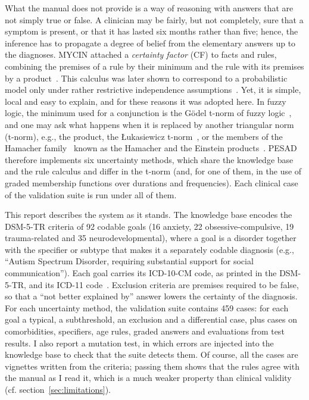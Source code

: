 What the manual does not provide is a way of reasoning with answers that are
not simply true or false. A clinician may be fairly, but not completely, sure
that a symptom is present, or that it has lasted six months rather than five;
hence, the inference has to propagate a degree of belief from the elementary
answers up to the diagnoses. MYCIN attached a \emph{certainty factor} (CF) to
facts and rules, combining the premises of a rule by their minimum and the rule
with its premises by a product~\cite{shortliffe-buchanan}. This calculus was
later shown to correspond to a probabilistic model only under rather restrictive
independence assumptions~\cite{heckerman}. Yet, it is simple, local and easy to
explain, and for these reasons it was adopted here. In fuzzy logic, the minimum used for a
conjunction is the G\"odel t-norm of fuzzy logic~\cite{zadeh,hajek}, and one may
ask what happens when it is replaced by another triangular norm (t-norm), e.g.,
the product, the \L{}ukasiewicz t-norm~\cite{lukasiewicz}, or the members of the
Hamacher family~\cite{hamacher} known as the Hamacher and the Einstein
products~\cite{klement}. PESAD therefore implements six uncertainty methods,
which share the knowledge base and the rule calculus and differ in the t-norm
(and, for one of them, in the use of graded membership functions over
durations and frequencies). Each clinical case of the validation suite is run under
all of them.

This report describes the system as it stands. The knowledge base encodes the
DSM-5-TR criteria of 92 codable goals (16 anxiety, 22 obsessive-compulsive, 19
trauma-related and 35 neurodevelopmental), where a goal is a disorder together
with the specifier or subtype that makes it a separately codable diagnosis
(e.g., ``Autism Spectrum Disorder, requiring substantial support for social
communication''). Each goal carries its ICD-10-CM code, as printed in the
DSM-5-TR, and its ICD-11 code~\cite{icd11}. Exclusion criteria are premises
required to be false, so that a ``not better explained by'' answer lowers the
certainty of the diagnosis. For each uncertainty method, the validation suite contains 459
cases: for each goal a typical, a subthreshold, an exclusion and a
differential case, plus cases on comorbidities, specifiers, age rules, graded
answers and evaluations from test results. I also report a mutation test, in
which errors are injected into the knowledge base to check that the suite
detects them. Of course, all the cases are vignettes written from the criteria;
passing them shows that the rules agree with the manual as I read it, which is a
much weaker property than clinical validity (cf.
section~\ref{sec:limitations}).

